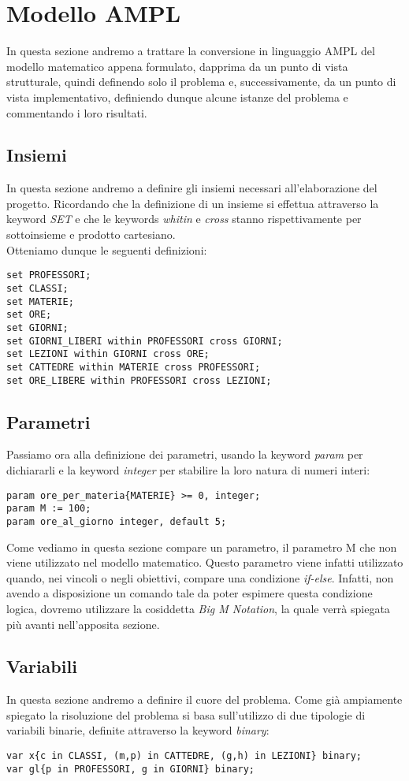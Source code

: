 \documentclass{article}
\begin{document}
\section{Modello AMPL}
In questa sezione andremo a trattare la conversione in linguaggio AMPL del modello matematico appena formulato, dapprima da un punto di vista strutturale, quindi definendo solo il problema e, successivamente, da un punto di vista implementativo, definiendo dunque alcune istanze del problema e commentando i loro risultati.
\subsection{Insiemi}
In questa sezione andremo a definire gli insiemi necessari all'elaborazione del progetto. Ricordando che la definizione di un insieme si effettua attraverso la keyword \emph{SET} e che le keywords \emph{whitin} e \emph{cross} stanno rispettivamente per sottoinsieme e prodotto cartesiano. 
\\Otteniamo dunque le seguenti definizioni:
\begin{verbatim}
set PROFESSORI;
set CLASSI;
set MATERIE;
set ORE;
set GIORNI;
set GIORNI_LIBERI within PROFESSORI cross GIORNI;
set LEZIONI within GIORNI cross ORE;
set CATTEDRE within MATERIE cross PROFESSORI;
set ORE_LIBERE within PROFESSORI cross LEZIONI;
\end{verbatim}
\subsection{Parametri}
Passiamo ora alla definizione dei parametri, usando la keyword \emph{param} per dichiararli e la keyword \emph{integer} per stabilire la loro natura di numeri interi:
\begin{verbatim}
param ore_per_materia{MATERIE} >= 0, integer;
param M := 100;
param ore_al_giorno integer, default 5;
\end{verbatim}
Come vediamo in questa sezione compare un parametro, il parametro M che non viene utilizzato nel modello matematico. Questo parametro viene infatti utilizzato quando, nei vincoli o negli obiettivi, compare una condizione \emph{if-else}. Infatti, non avendo a disposizione un comando tale da poter espimere questa condizione logica, dovremo utilizzare la cosiddetta \emph{Big M Notation}, la quale verrà spiegata più avanti nell'apposita sezione.

\subsection{Variabili}
In questa sezione andremo a definire il cuore del problema. Come già ampiamente spiegato la risoluzione del problema si basa sull'utilizzo di due tipologie di variabili binarie, definite attraverso la keyword \emph{binary}:
\begin{verbatim}
var x{c in CLASSI, (m,p) in CATTEDRE, (g,h) in LEZIONI} binary;
var gl{p in PROFESSORI, g in GIORNI} binary;
\end{verbatim}
\end{document}
